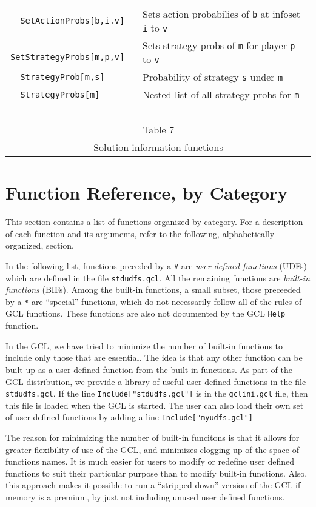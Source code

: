 \begin{table}[htp]
\begin{center}
\begin{tabular} {|l||l|}
\verb+  SetActionProbs[b,i.v]+ & Sets action probabilies of \verb+b+ at infoset \verb+i+ to \verb+v+\\
\verb+  SetStrategyProbs[m,p,v]+ & Sets strategy probs of \verb+m+ for
player \verb+p+ to \verb+v+\\
\verb+  StrategyProb[m,s]+ & Probability of strategy \verb+s+ under \verb+m+ \\
\verb+  StrategyProbs[m]+ & Nested list of all strategy probs for \verb+m+\\
\hline
\multicolumn{2}{c}{\ }\\
\multicolumn{2}{c}{Table 7}\\
\multicolumn{2}{c}{Solution information functions}\\
\end{tabular}
\end{center}
\end{table}
\medskip


\chapter{Function Reference, by Category}

This section contains a list of functions organized by
category.  For a description of each function and its arguments,
refer to the following, alphabetically organized, section.  

In the following list, functions preceded by a \verb+#+ are {\it user
defined functions} (UDFs) which are defined in the file
\verb+stdudfs.gcl+.  All the remaining functions are {\it built-in
functions} (BIFs).  Among the built-in functions, a small subset,
those preceeded by a \verb+*+ are ``special'' functions, which do not
necessarily follow all of the rules of GCL functions.  These functions
are also not documented by the GCL \verb+Help+ function.  

In the GCL, we have tried to minimize the number of built-in functions
to include only those that are essential.  The idea is that any other
function can be built up as a user defined function from the built-in
functions.  As part of the GCL distribution, we provide a library of
useful user defined functions in the file \verb+stdudfs.gcl+.  If the
line \verb+Include["stdudfs.gcl"]+ is in the \verb+gclini.gcl+ file,
then this file is loaded when the GCL is started.  The user can also
load their own set of user defined functions by adding a line
\verb+Include["myudfs.gcl"]+

The reason for minimizing the number of built-in funcitons is that it
allows for greater flexibility of use of the GCL, and minimizes
clogging up of the space of functions names.  It is much easier for
users to modify or redefine user defined functions to suit their
particular purpose than to modify built-in functions.  Also, this
approach makes it possible to run a ``stripped down'' version of the
GCL if memory is a premium, by just not including unused user defined
functions.

